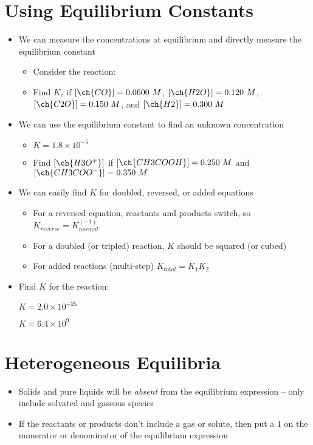 \documentclass[12pt, openany, letterpaper]{memoir}
\begin{document}
\section{Using Equilibrium Constants}
\begin{itemize}
	\item We can measure the concentrations at equilibrium and directly measure the equilibrium constant
	\begin{itemize}
		\item Consider the reaction: 
		\item Find $K_c$ if $\left[\ch{CO}\right]=0.0600~M$, $\left[\ch{H2O}\right]=0.120~M$, $\left[\ch{C2O}\right]=0.150~M$, and $\left[\ch{H2}\right]=0.300~M$
	\end{itemize}
	\item We can use the equilibrium constant to find an unknown concentration
	\begin{itemize}
		\item {} \hspace{1em} $K=1.8\times10^{-5}$
		\item Find $\left[\ch{H3O^+}\right]$ if $\left[\ch{CH3COOH}\right] = 0.250~M$ and $\left[\ch{CH3COO^-}\right]=0.350~M$
	\end{itemize}
	\item We can easily find $K$ for doubled, reversed, or added equations
	\begin{itemize}
		\item For a reversed equation, reactants and products switch, so $K_{reverse} = K_{normal}^(-1)$
		\item For a doubled (or tripled) reaction, $K$ should be squared (or cubed)
		\item For added reactions (multi-step) $K_{total}=K_1K_2$
	\end{itemize}
	\item Find $K$ for the reaction: 
	
	 \hspace{1em} $K=2.0\times10^{-25}$
	
	 \hspace{1em} $K=6.4\times10^{9}$
\end{itemize}

\section{Heterogeneous Equilibria}
\begin{itemize}
	\item Solids and pure liquids will be \emph{absent} from the equilibrium expression -- only include solvated and gaseous species
  \item If the reactants or products don't include a gas or solute, then put a $1$ on the numerator or denominator of the equilibrium expression
\end{itemize}
\end{document}
